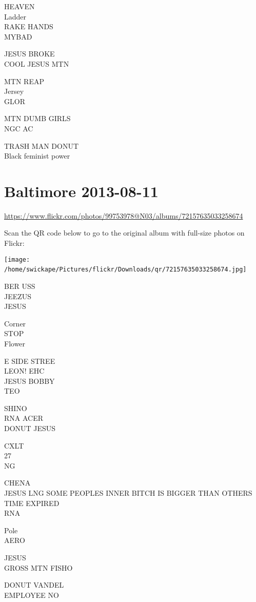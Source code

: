 \documentclass[10pt,letterpaper]{article}
\begin{document}
HEAVEN\\
Ladder\\
RAKE HANDS\\
MYBAD

JESUS BROKE\\
COOL JESUS MTN

MTN REAP\\
Jersey\\
GLOR

MTN DUMB GIRLS\\
NGC AC

TRASH MAN DONUT\\
Black feminist power
\

\section*{Baltimore 2013-08-11}

\url{https://www.flickr.com/photos/99753978@N03/albums/72157635033258674}

Scan the QR code below to go to the original album with full-size photos on Flickr:

\texttt{[image: /home/swickape/Pictures/flickr/Downloads/qr/72157635033258674.jpg]}
\

BER USS\\
JEEZUS\\
JESUS

Corner\\
STOP\\
Flower

E SIDE STREE\\
LEON! EHC\\
JESUS BOBBY\\
TEO

SHINO\\
RNA ACER\\
DONUT JESUS

CXLT\\
27\\
NG

CHENA\\
JESUS LNG SOME PEOPLES INNER BITCH IS BIGGER THAN OTHERS\\
TIME EXPIRED\\
RNA

Pole\\
AERO

JESUS\\
GROSS MTN FISHO

DONUT VANDEL\\
EMPLOYEE NO
\end{document}
